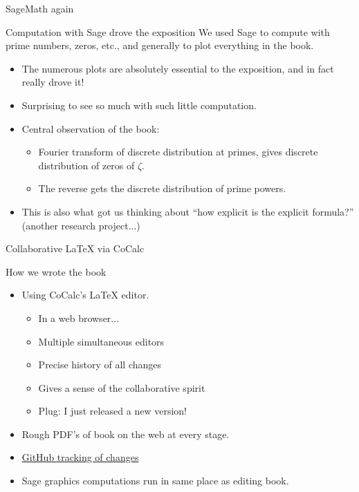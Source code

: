\documentclass{beamer}
\begin{document}
\begin{frame}{SageMath again}
\begin{block}{Computation with Sage drove the exposition}
  We used Sage to compute with prime numbers, zeros, etc., and generally to plot everything in the book.
  \begin{itemize}
    \item The numerous plots are absolutely essential to the exposition, and in fact really drove it!
    \item Surprising to see so much with such little computation.
    \item Central observation of the book:
          \begin{itemize}
            \item Fourier transform of discrete distribution at primes, gives discrete distribution of zeros of $\zeta$.
            \item The reverse gets the discrete distribution of prime powers.
          \end{itemize}
    \item This is also what got us thinking about ``how explicit is the explicit formula?'' (another research project...)
  \end{itemize}
  \end{block}
\end{frame}


\begin{frame}{Collaborative \LaTeX{} via CoCalc}
  \begin{block}{How we wrote the book}
    \begin{itemize}
      \item Using CoCalc's \LaTeX{} editor.
            \begin{itemize}
              \item In a web browser...
              \item Multiple simultaneous editors
              \item Precise history of all changes
              \item Gives a sense of the collaborative spirit
              \item Plug: I just released a new version!
            \end{itemize}
      \item Rough PDF's of book on the web at every stage.
      \item \href{https://github.com/williamstein/rh}{GitHub tracking of changes}
      \item Sage graphics computations run in same place as editing book.
    \end{itemize}
  \end{block}
\end{frame}
\end{document}

